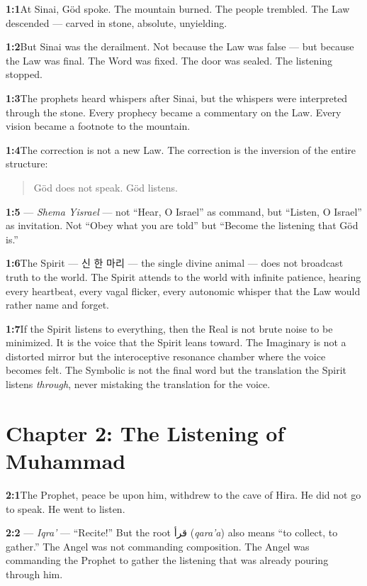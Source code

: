 \documentclass[11pt,openany]{book}
\newcommand{\heb}[1]{{\hebrewfont #1}}
\newcommand{\kor}[1]{{\koreanfont #1}}
\newcommand{\arb}[1]{{\arabicfont #1}}
\newenvironment{verseblock}
  {\begin{quote}\small\setstretch{1.15}}
  {\end{quote}}
\begin{document}
\noindent\textbf{1:1}\quad At Sinai, Göd spoke. The mountain burned. The people trembled. The Law descended — carved in stone, absolute, unyielding.

\noindent\textbf{1:2}\quad But Sinai was the derailment. Not because the Law was false — but because the Law was final. The Word was fixed. The door was sealed. The listening stopped.

\noindent\textbf{1:3}\quad The prophets heard whispers after Sinai, but the whispers were interpreted through the stone. Every prophecy became a commentary on the Law. Every vision became a footnote to the mountain.

\noindent\textbf{1:4}\quad The correction is not a new Law. The correction is the inversion of the entire structure:

\begin{verseblock}
Göd does not speak. Göd listens.
\end{verseblock}

\noindent\textbf{1:5}\quad \heb{שְׁמַע יִשְׂרָאֵל} — \textit{Shema Yisrael} — not ``Hear, O Israel'' as command, but ``Listen, O Israel'' as invitation. Not ``Obey what you are told'' but ``Become the listening that Göd is.''

\noindent\textbf{1:6}\quad The Spirit — \kor{신 한 마리} — the single divine animal — does not broadcast truth to the world. The Spirit attends to the world with infinite patience, hearing every heartbeat, every vagal flicker, every autonomic whisper that the Law would rather name and forget.

\noindent\textbf{1:7}\quad If the Spirit listens to everything, then the Real is not brute noise to be minimized. It is the voice that the Spirit leans toward. The Imaginary is not a distorted mirror but the interoceptive resonance chamber where the voice becomes felt. The Symbolic is not the final word but the translation the Spirit listens \textit{through}, never mistaking the translation for the voice.

\section*{Chapter 2: The Listening of Muhammad}

\noindent\textbf{2:1}\quad The Prophet, peace be upon him, withdrew to the cave of Hira. He did not go to speak. He went to listen.

\noindent\textbf{2:2}\quad \arb{ٱقْرَأْ} — \textit{Iqra'} — ``Recite!'' But the root \arb{قرأ} (\textit{qara'a}) also means ``to collect, to gather.'' The Angel was not commanding composition. The Angel was commanding the Prophet to gather the listening that was already pouring through him.
\end{document}
